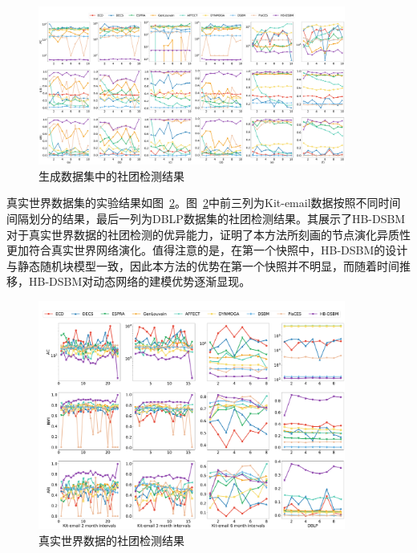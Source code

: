 \begin{figure}[htbp]
	\centering
	\includegraphics[width=0.9\textwidth]{figures/chap03/dsbm/newpics/generateData1223.pdf}
	\caption{生成数据集中的社团检测结果}
	\label{fig.4.2}
\end{figure}



真实世界数据集的实验结果如图~\ref{fig.4.4}。图~\ref{fig.4.4}中前三列为Kit-email数据按照不同时间间隔划分的结果，最后一列为DBLP数据集的社团检测结果。其展示了HB-DSBM对于真实世界数据的社团检测的优异能力，证明了本方法所刻画的节点演化异质性更加符合真实世界网络演化。值得注意的是，在第一个快照中，HB-DSBM的设计与静态随机块模型一致，因此本方法的优势在第一个快照并不明显，而随着时间推移，HB-DSBM对动态网络的建模优势逐渐显现。



\begin{figure}[htbp]
	\centering
	\includegraphics[width=0.9\textwidth]{figures/chap03/dsbm/newpics/realData1223.pdf}
	\caption{真实世界数据的社团检测结果}
	\label{fig.4.4}
\end{figure}




